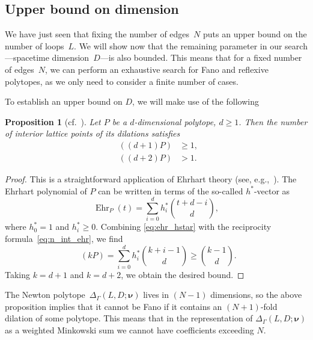 \documentclass[12pt,a4paper]{article}
\theoremstyle{plain}
\newtheorem{proposition}[theorem]{Proposition}
\theoremstyle{remark}
\newcommand{\nprops}{N}
\DeclareMathOperator{\nint}{N_{\mathrm{int}}}
\newcommand{\undernotation}[1]{\pmb{#1}}
\newcommand{\Newton}{\Delta}
\DeclareMathOperator{\ehr}{Ehr}
\begin{document}
\subsection{Upper bound on dimension}\label{sec:upperdim}
We have just seen that fixing the number of edges~$\nprops$ puts an upper bound on the number of loops~$L$.
We will show now that the remaining parameter in our search---spacetime dimension~$D$---is also bounded.
This means that for a fixed number of edges~$\nprops$, we can perform an exhaustive search for Fano and reflexive polytopes, as we only need to consider a finite number of cases.

To establish an upper bound on $D$, we will make use of the following
\begin{proposition}[cf.~{\cite[Exercise 4.10]{Beck:2015}}]
	Let \(P\) be a \(d\)-dimensional polytope, \(d \geq 1\). Then the number of interior lattice points of its dilations satisfies
	\begin{equation}
		\begin{aligned}
			\nint((d+1)P) & \geq 1, \\
			\nint((d+2)P) & > 1.
		\end{aligned}
	\end{equation}
\end{proposition}
\begin{proof}
	This is a straightforward application of Ehrhart theory (see, e.g.,~\cite[Chapters 3 and 4]{Beck:2015}). The Ehrhart polynomial of \(P\) can be written in terms of the so-called \(h^*\)-vector as
	\begin{equation}
		\ehr_P(t) = \sum_{i=0}^d h_i^* \binom{t+d-i}{d},
		\label{eq:ehr_hstar}
	\end{equation}
	where \(h_0^* = 1\) and \(h_i^* \geq 0\). Combining \cref{eq:ehr_hstar} with the reciprocity formula~\eqref{eq:n_int_ehr}, we find
	\begin{equation}
		\nint(kP) = \sum_{i=0}^d h_i^* \binom{k+i-1}{d} \geq \binom{k-1}{d}. 
	\end{equation}
	Taking \(k=d+1\) and \(k=d+2\), we obtain the desired bound.
\end{proof}

The Newton polytope~\(\Newton_\Gamma(L, D; \undernotation{\nu})\) lives in \((N-1)\) dimensions, so the above proposition implies that it cannot be Fano if it contains an \((N+1)\)-fold dilation of some polytope.
This means that in the representation of \(\Newton_\Gamma(L, D; \undernotation{\nu})\) as a weighted Minkowski sum we cannot have coefficients exceeding \(N\).
\end{document}
